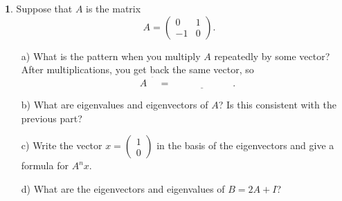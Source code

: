 \documentclass{article}
\theoremstyle{definition}
\newtheorem{prob}{}
\begin{document}
%
%
%
%
%


\begin{prob}
	Suppose that $A$ is the matrix
	\[A = \begin{pmatrix} 0 & 1 \\ -1 & 0 \end{pmatrix}.\]
\begin{itemize}
	
	\item[a)] What is the pattern when you multiply $A$ repeatedly by some vector?  After \underline{\phantom{aaaaaaa}} multiplications, you get back the same vector, so 
	\[A^{\overline{\phantom{aaa}}} = \underline{\phantom{aaaaaaaaaaaa}}.\]
	
	\item[b)] What are eigenvalues and eigenvectors of $A$?  Is this consistent with the previous part?
	
	\item[c)] Write the vector $x = \begin{pmatrix} 1 \\ 0 \end{pmatrix}$ in the basis of the eigenvectors and give a formula for $A^n x$.
	
	\item[d)] What are the eigenvectors and eigenvalues of $B = 2A + I$?
	
\end{itemize}	
\end{prob}
\end{document}
